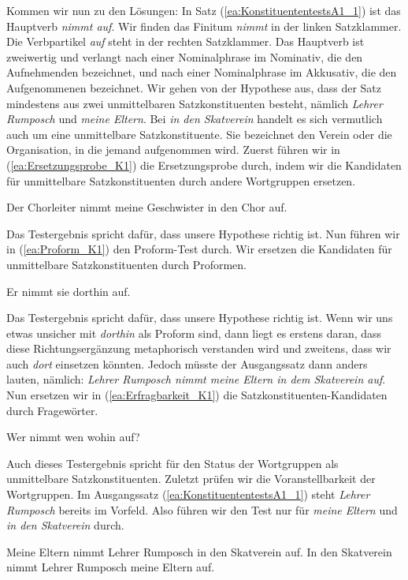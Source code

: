 Kommen wir nun zu den Lösungen: In Satz (\ref{ea:KonstituententestsA1_1}) ist das Hauptverb \textit{nimmt auf}. Wir finden das Finitum \textit{nimmt} in der linken Satzklammer. Die Verbpartikel \textit{auf} steht in der rechten Satzklammer. Das Hauptverb ist zweiwertig und verlangt nach einer Nominalphrase im Nominativ, die den Aufnehmenden bezeichnet, und nach einer Nominalphrase im Akkusativ, die den Aufgenommenen bezeichnet. Wir gehen von der Hypothese aus, dass der Satz mindestens aus zwei unmittelbaren Satzkonstituenten besteht, nämlich \textit{Lehrer Rumposch} und \textit{meine Eltern}. Bei \textit{in den Skatverein} handelt es sich vermutlich auch um eine unmittelbare Satzkonstituente. Sie bezeichnet den Verein oder die Organisation, in die jemand aufgenommen wird. Zuerst führen wir in (\ref{ea:Ersetzungsprobe_K1}) die Ersetzungsprobe durch, indem wir die Kandidaten für unmittelbare Satzkonstituenten durch andere Wortgruppen ersetzen.

\ea \label{ea:Ersetzungsprobe_K1} Der Chorleiter nimmt meine Geschwister in den Chor auf. 
\z 

Das Testergebnis spricht dafür, dass unsere Hypothese richtig ist. Nun führen wir in (\ref{ea:Proform_K1}) den Proform-Test durch. Wir ersetzen die Kandidaten für unmittelbare Satzkonstituenten durch Proformen. 

\ea \label{ea:Proform_K1} Er nimmt sie dorthin auf.  
\z 

Das Testergebnis spricht dafür, dass unsere Hypothese richtig ist. Wenn wir uns etwas unsicher mit \textit{dorthin} als Proform sind, dann liegt es erstens daran, dass diese Richtungsergänzung metaphorisch verstanden wird und zweitens, dass wir auch \textit{dort} einsetzen könnten. Jedoch müsste der Ausgangssatz dann anders lauten, nämlich: \textit{Lehrer Rumposch nimmt meine Eltern in dem Skatverein auf}. Nun ersetzen wir in (\ref{ea:Erfragbarkeit_K1}) die Satzkonstituenten-Kandidaten durch Fragewörter. 

\ea \label{ea:Erfragbarkeit_K1} Wer nimmt wen wohin auf?  
\z 

Auch dieses Testergebnis spricht für den Status der Wortgruppen als unmittelbare Satzkonstituenten. Zuletzt prüfen wir die Voranstellbarkeit der Wortgruppen. Im Ausgangssatz (\ref{ea:KonstituententestsA1_1}) steht \textit{Lehrer Rumposch} bereits im Vorfeld. Also führen wir den Test nur für \textit{meine Eltern} und \textit{in den Skatverein} durch.

\ea 
\ea \label{ea:Voranstellung_K1_1} Meine Eltern nimmt Lehrer Rumposch in den Skatverein auf.  
\ex \label{ea:Voranstellung_K1_2} In den Skatverein nimmt Lehrer Rumposch meine Eltern auf.
\z
\z 

